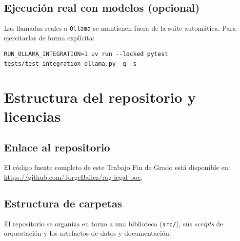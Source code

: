\section{Ejecución real con modelos (opcional)}
\label{sec:app-ollama}

Las llamadas reales a \texttt{Ollama} se mantienen fuera de la suite automática. Para ejercitarlas de forma explícita:

\begin{lstlisting}
RUN_OLLAMA_INTEGRATION=1 uv run --locked pytest tests/test_integration_ollama.py -q -s
\end{lstlisting}

\chapter{Estructura del repositorio y licencias}
\label{app:repo}

\section{Enlace al repositorio}
\label{sec:app-enlace}

El código fuente completo de este Trabajo Fin de Grado está disponible en: \url{https://github.com/JorgeBailez/rag-legal-boe}.

\section{Estructura de carpetas}
\label{sec:app-estructura}

El repositorio se organiza en torno a una biblioteca (\texttt{src/}), sus \emph{scripts} de orquestación y los artefactos de datos y documentación:

